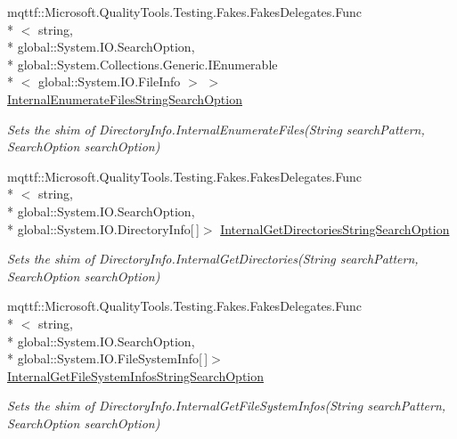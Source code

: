 \begin{DoxyCompactItemize}
mqttf\-::\-Microsoft.\-Quality\-Tools.\-Testing.\-Fakes.\-Fakes\-Delegates.\-Func\\*
$<$ string, \\*
global\-::\-System.\-I\-O.\-Search\-Option, \\*
global\-::\-System.\-Collections.\-Generic.\-I\-Enumerable\\*
$<$ global\-::\-System.\-I\-O.\-File\-Info $>$ $>$ \hyperlink{class_system_1_1_i_o_1_1_fakes_1_1_shim_directory_info_a39884c624b95796a109284b2d06c15fa}{Internal\-Enumerate\-Files\-String\-Search\-Option}
\begin{DoxyCompactList}\small\item\em Sets the shim of Directory\-Info.\-Internal\-Enumerate\-Files(\-String search\-Pattern, Search\-Option search\-Option)\end{DoxyCompactList}\item 
mqttf\-::\-Microsoft.\-Quality\-Tools.\-Testing.\-Fakes.\-Fakes\-Delegates.\-Func\\*
$<$ string, \\*
global\-::\-System.\-I\-O.\-Search\-Option, \\*
global\-::\-System.\-I\-O.\-Directory\-Info\mbox{[}$\,$\mbox{]}$>$ \hyperlink{class_system_1_1_i_o_1_1_fakes_1_1_shim_directory_info_adc82f640c6db84b2197d780d2ecdb04e}{Internal\-Get\-Directories\-String\-Search\-Option}
\begin{DoxyCompactList}\small\item\em Sets the shim of Directory\-Info.\-Internal\-Get\-Directories(\-String search\-Pattern, Search\-Option search\-Option)\end{DoxyCompactList}\item 
mqttf\-::\-Microsoft.\-Quality\-Tools.\-Testing.\-Fakes.\-Fakes\-Delegates.\-Func\\*
$<$ string, \\*
global\-::\-System.\-I\-O.\-Search\-Option, \\*
global\-::\-System.\-I\-O.\-File\-System\-Info\mbox{[}$\,$\mbox{]}$>$ \hyperlink{class_system_1_1_i_o_1_1_fakes_1_1_shim_directory_info_a8aec4bf40a409d86967e743043183400}{Internal\-Get\-File\-System\-Infos\-String\-Search\-Option}
\begin{DoxyCompactList}\small\item\em Sets the shim of Directory\-Info.\-Internal\-Get\-File\-System\-Infos(\-String search\-Pattern, Search\-Option search\-Option)\end{DoxyCompactList}\item 

\end{DoxyCompactItemize}
